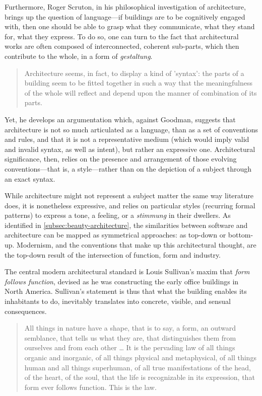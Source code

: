 Furthermore, Roger Scruton, in his philosophical investigation of architecture, brings up the question of language—if buildings are to be cognitively engaged with, then one should be able to grasp what they communicate, what they stand for, what they express. To do so, one can turn to the fact that architectural works are often composed of interconnected, coherent sub-parts, which then contribute to the whole, in a form of \emph{gestaltung}.

\begin{quote}
    Architecture seems, in fact, to display a kind of 'syntax': the parts of a building seem to be fitted together in such a way that the meaningfulness of the whole will reflect and depend upon the manner of combination of its parts. \citep{scruton_aesthetics_2013}
\end{quote}

Yet, he develops an argumentation which, against Goodman, suggests that architecture is not so much articulated as a language, than as a set of conventions and rules, and that it is not a representative medium (which would imply valid and invalid syntax, as well as intent), but rather an expressive one. Architectural significance, then, relies on the presence and arrangement of those evolving conventions—that is, a style—rather than on the depiction of a subject through an exact syntax.

While architecture might not represent a subject matter the same way literature does, it is nonetheless expressive, and relies on particular styles (recurring formal patterns) to express a tone, a feeling, or a \emph{stimmung} in their dwellers. As identified in \ref{subsec:beauty-architecture}, the similarities between software and architecture can be mapped as symmetrical approaches: as top-down or bottom-up. Modernism, and the conventions that make up this architectural thought, are the top-down result of the intersection of function, form and industry.

The central modern architectural standard is Louis Sullivan's maxim that \emph{form follows function}, devised as he was constructing the early office buildings in North America. Sullivan's statement is thus that what the building enables its inhabitants to do, inevitably translates into concrete, visible, and sensual consequences.

\begin{quote}
    All things in nature have a shape, that is to say, a form, an outward semblance, that tells us what they are, that distinguishes them from ourselves and from each other
    \dots
    It is the pervading law of all things organic and inorganic, of all things physical and metaphysical, of all things human and all things superhuman, of all true manifestations of the head, of the heart, of the soul, that the life is recognizable in its expression, that form ever follows function. This is the law. \citep{sullivan_tall_1896}
\end{quote}

